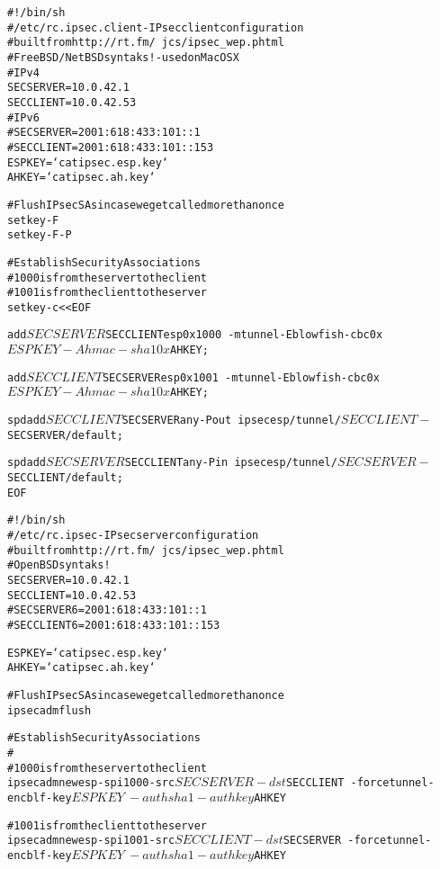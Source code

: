 \documentclass[Screen16to9,17pt]{foils}
\begin{document}

\begin{alltt}\footnotesize
#!/bin/sh
# /etc/rc.ipsec.client - IPsec client configuration
# built from http://rt.fm/~jcs/ipsec_wep.phtml
# FreeBSD/NetBSD syntaks! - used on Mac OS X
# IPv4
SECSERVER=10.0.42.1
SECCLIENT=10.0.42.53
# IPv6
#SECSERVER=2001:618:433:101::1
#SECCLIENT=2001:618:433:101::153
ESPKEY=`cat ipsec.esp.key`
AHKEY=`cat ipsec.ah.key`

# Flush IPsec SAs in case we get called more than once
setkey -F
setkey -F -P
\end{alltt}


\begin{alltt}\footnotesize
# Establish Security Associations
# 1000 is from the server to the client
# 1001 is from the client to the server
setkey -c <<EOF

add $SECSERVER $SECCLIENT esp 0x1000 \
-m tunnel -E blowfish-cbc 0x$ESPKEY  -A hmac-sha1 0x$AHKEY;

add $SECCLIENT $SECSERVER esp 0x1001 \
-m tunnel -E blowfish-cbc 0x$ESPKEY -A hmac-sha1 0x$AHKEY;

spdadd $SECCLIENT $SECSERVER any -P out \
ipsec esp/tunnel/$SECCLIENT-$SECSERVER/default;

spdadd $SECSERVER $SECCLIENT any -P in \
ipsec esp/tunnel/$SECSERVER-$SECCLIENT/default;
EOF
\end{alltt}


\begin{alltt}\small
#!/bin/sh
# /etc/rc.ipsec - IPsec server configuration
# built from http://rt.fm/~jcs/ipsec_wep.phtml
# OpenBSD syntaks!
SECSERVER=10.0.42.1
SECCLIENT=10.0.42.53
#SECSERVER6=2001:618:433:101::1
#SECCLIENT6=2001:618:433:101::153

ESPKEY=`cat ipsec.esp.key`
AHKEY=`cat ipsec.ah.key`

# Flush IPsec SAs in case we get called more than once
ipsecadm flush
\end{alltt}



\begin{alltt}\small
# Establish Security Associations
#
# 1000 is from the server to the client
ipsecadm new esp -spi 1000 -src $SECSERVER -dst $SECCLIENT \
-forcetunnel -enc blf -key $ESPKEY \
-auth sha1 -authkey $AHKEY

# 1001 is from the client to the server
ipsecadm new esp -spi 1001 -src $SECCLIENT -dst $SECSERVER \
-forcetunnel -enc blf -key $ESPKEY \
-auth sha1 -authkey $AHKEY
\end{alltt}
\end{document}
